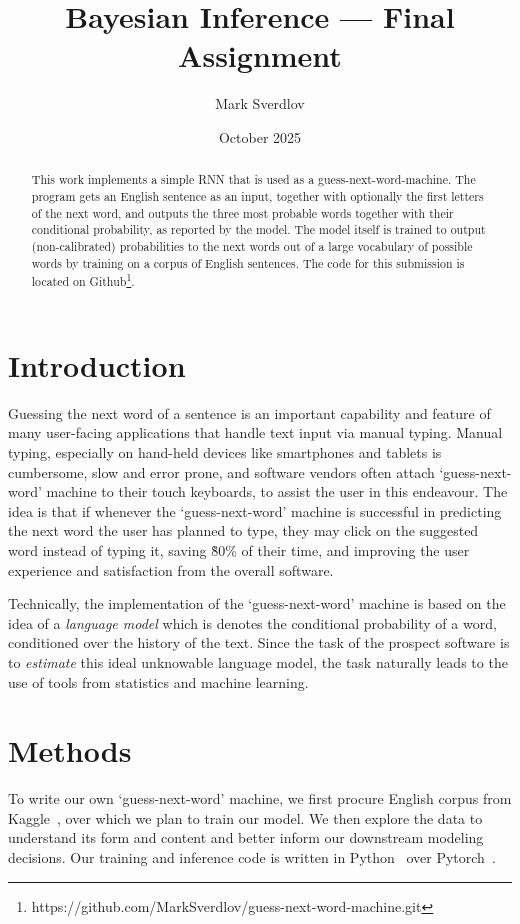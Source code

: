 \documentclass{article}
\title{Bayesian Inference --- Final Assignment}
\author{Mark Sverdlov}
\date{October 2025}
\theoremstyle{plain}
\theoremstyle{definition}
\theoremstyle{definition}
\theoremstyle{remark}
\begin{document}
    

\maketitle

\begin{abstract}
    This work implements a simple RNN that is used as a guess-next-word-machine. The program gets an English sentence as an input, together with optionally the first letters of the next word, and outputs the three most probable words together with their conditional probability, as reported by the model. The model itself is trained to output (non-calibrated) probabilities to the next words out of a large vocabulary of possible words by training on a corpus of English
    sentences. The code for this submission is located on Github\footnote{https://github.com/MarkSverdlov/guess-next-word-machine.git}.
\end{abstract}

\section{Introduction}
Guessing the next word of a sentence is an important capability and feature of many user-facing applications that handle text input via manual typing. Manual typing, especially on hand-held devices like smartphones and tablets is cumbersome, slow and error prone, and software vendors often attach `guess-next-word' machine to their touch keyboards, to assist the user in this endeavour. The idea is that if whenever the `guess-next-word' machine is successful in predicting the next word the user
has planned to type, they may click on the suggested word instead of typing it, saving \~80\% of their time, and improving the user experience and satisfaction from the overall software.

Technically, the implementation of the `guess-next-word' machine is based on the idea of a \emph{language model} which is denotes the conditional probability of a word, conditioned over the history of the text. Since the task of the prospect software is to \emph{estimate} this ideal unknowable language model, the task naturally leads to the use of tools from statistics and machine learning.

\section{Methods}
To write our own `guess-next-word' machine, we first procure English corpus from Kaggle~\cite{kaggle-data}, over which we plan to train our model. We then explore the data to understand its form and content and better inform our downstream modeling decisions. Our training and inference code is written in Python~\cite{python} over Pytorch~\cite{pytorch}.
\end{document}
